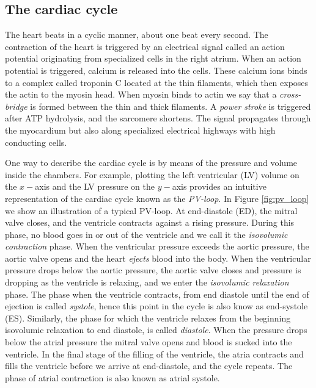 \subsection{The cardiac cycle}
\label{sec:cardiac_cycle}

The heart beats in a cyclic manner, about one beat every second.
The contraction of the heart is triggered by an electrical signal called an action
potential originating from specialized cells in the right atrium. When an action
potential is triggered, calcium is released into the cells. These
calcium ions binds to a complex called troponin C located at the thin
filaments, which then exposes the actin to the myosin head. When
myosin binds to actin we say that a \emph{cross-bridge} is formed
between the thin and thick filaments. A \emph{power stroke} is
triggered after ATP hydrolysis, and the sarcomere shortens. 
The signal propagates through the myocardium but also along
specialized electrical highways with high conducting cells.

One way to describe the cardiac cycle is by means of
the pressure and volume inside the chambers. For example, plotting
the left ventricular (LV) volume on the $x-$axis and the LV pressure on the $y-$axis
provides an intuitive representation of the cardiac cycle known as the
\emph{PV-loop}. In Figure \ref{fig:pv_loop} we show an illustration of
a typical PV-loop. At end-diastole (ED), the mitral valve closes, and
the ventricle contracts against a rising pressure. During this phase,
no blood goes in or out of the ventricle and we call it the
\emph{isovolumic contraction} phase. When the
ventricular pressure exceeds the aortic pressure, the aortic valve
opens and the heart \emph{ejects} blood into the body. When the ventricular
pressure drops below the aortic pressure, the aortic valve closes and
pressure is dropping as the ventricle is relaxing, and we enter the
\emph{isovolumic relaxation} phase. The phase when the ventricle
contracts, from end diastole until the end of ejection is called
\emph{systole}, hence this point in the cycle is also know as
end-systole (ES). Similarly, the phase for which the ventricle
relaxes from the beginning isovolumic relaxation to end diastole, is
called \emph{diastole}. When the pressure drops below the atrial pressure 
the mitral valve opens and blood is sucked into the ventricle. In the
final stage of the filling of the ventricle, the atria contracts and
fills the ventricle before we arrive at end-diastole, and the cycle
repeats. The phase of atrial contraction is also known as atrial
systole. 



